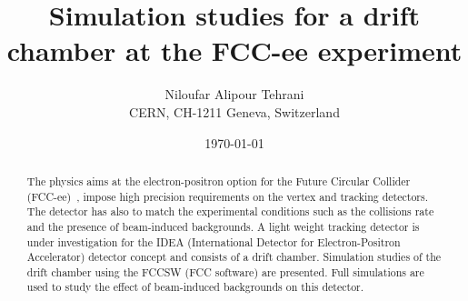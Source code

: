\documentclass{cernatsnote}
\title{Simulation studies for a drift chamber at the FCC-ee experiment}
\author{
	Niloufar Alipour Tehrani \; \\
	CERN, CH-1211 Geneva, Switzerland
}
\date{\today}
\begin{document}
\maketitle

\begin{abstract}
	The physics aims at the electron-positron option for  the Future Circular Collider (FCC-ee)~\cite{Gomez-Ceballos:2013zzn}, impose high precision requirements on the vertex and tracking detectors.  The detector has also to match the experimental conditions such as the collisions rate and the presence of beam-induced backgrounds.
	A light weight tracking detector is under investigation for the IDEA (International Detector for Electron-Positron Accelerator) detector concept and consists of a drift chamber. Simulation studies of the drift chamber using the FCCSW (FCC software) are presented. Full simulations are used to study the effect of beam-induced backgrounds on this detector.
\end{abstract}
\\ \\ \\

\begingroup
\color{black}
\tableofcontents
\endgroup

\pagebreak









\end{document}

